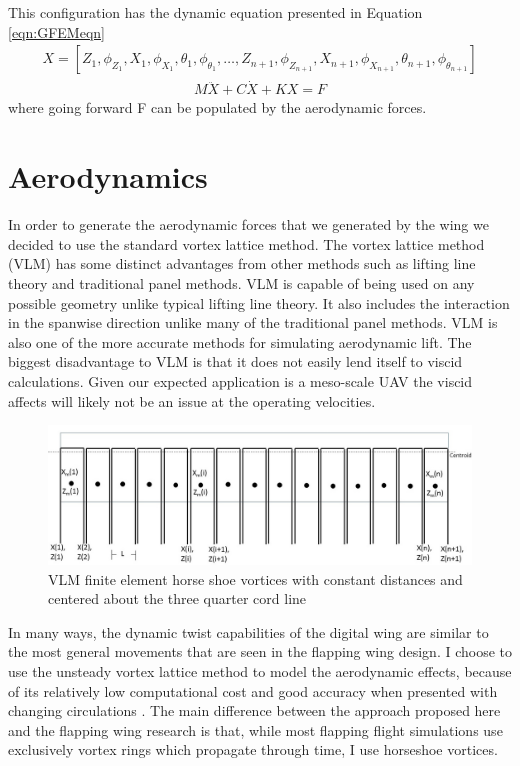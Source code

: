 \documentclass[11pt]{ucthesis}
\begin{document}
This configuration has the dynamic equation presented in Equation \ref{eqn:GFEMeqn}
\begin{eqnarray}
X = [Z_1,\phi_{Z_1}, X_1,\phi_{X_1},\theta_1,\phi_{\theta_1}, \ldots,Z_{n+1},\phi_{Z_{n+1}}, X_{n+1},\phi_{X_{n+1}},\theta_{n+1},\phi_{\theta_{n+1}}]
\end{eqnarray}
\begin{eqnarray}
M\ddot{X}+C\dot{X}+KX = F
\label{eqn:GFEMeqn}
\end{eqnarray}
where going forward F can be populated by the aerodynamic forces.

\section{Aerodynamics}
\label{sec:aeroModel}
In order to generate the aerodynamic forces that we generated by the wing we decided to use the standard vortex lattice method. The vortex lattice method (VLM) has some distinct advantages from other methods such as lifting line theory and traditional panel methods. VLM is capable of being used on any possible geometry unlike typical lifting line theory. It also includes the interaction in the spanwise direction unlike many of the traditional panel methods. VLM is also one of the more accurate methods for simulating aerodynamic lift. \cite{bertin1998aerodynamics} The biggest disadvantage to VLM is that it does not easily lend itself to viscid calculations. Given our expected application is a meso-scale UAV the viscid affects will likely not be an issue at the operating velocities.
\begin{figure}[h]
\centering
\includegraphics[width=1\linewidth]{Figures/VortexLaticeMethod.jpg}
\caption{VLM finite element horse shoe vortices with constant distances and centered about the three quarter cord line}
\label{fig:VLM}
\end{figure}

In many ways, the dynamic twist capabilities of the digital wing are similar to the most general movements that are seen in the flapping wing design. I choose to use the unsteady vortex lattice method to model the aerodynamic effects, because of its relatively low computational cost and good accuracy when presented with changing circulations \cite{long2004object,stanford2010analytical,de2012object}. The main difference between the approach proposed here and the flapping wing research is that, while most flapping flight simulations use exclusively vortex rings which propagate through time, I use horseshoe vortices. 
\end{document}
